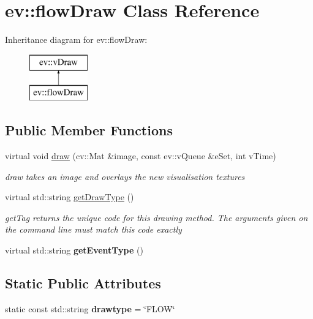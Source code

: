 \hypertarget{classev_1_1flowDraw}{}\section{ev\+:\+:flow\+Draw Class Reference}
\label{classev_1_1flowDraw}
Inheritance diagram for ev\+:\+:flow\+Draw\+:\begin{figure}[H]
\begin{center}
\leavevmode
\includegraphics[height=2.000000cm]{classev_1_1flowDraw}
\end{center}
\end{figure}
\subsection*{Public Member Functions}
\begin{DoxyCompactItemize}
\item 
virtual void \hyperlink{classev_1_1flowDraw_a15d97ddaf93734a912be64fb60977ee2}{draw} (cv\+::\+Mat \&image, const ev\+::v\+Queue \&e\+Set, int v\+Time)
\begin{DoxyCompactList}\small\item\em draw takes an image and overlays the new visualisation textures \end{DoxyCompactList}\item 
virtual std\+::string \hyperlink{classev_1_1flowDraw_a6caf6d848d79407e62b7bf13c58d583e}{get\+Draw\+Type} ()
\begin{DoxyCompactList}\small\item\em get\+Tag returns the unique code for this drawing method. The arguments given on the command line must match this code exactly \end{DoxyCompactList}\item 
\mbox{\label{classev_1_1flowDraw_ad70fa4b0401da0c426802fe185b3c1b8}} 
virtual std\+::string {\bfseries get\+Event\+Type} ()
\end{DoxyCompactItemize}
\subsection*{Static Public Attributes}
\begin{DoxyCompactItemize}
\item 
\mbox{\label{classev_1_1flowDraw_a6ff0f7b973f6dda5923e399b4abdcc3c}} 
static const std\+::string {\bfseries drawtype} = \char`\"{}F\+L\+OW\char`\"{}
\end{DoxyCompactItemize}

